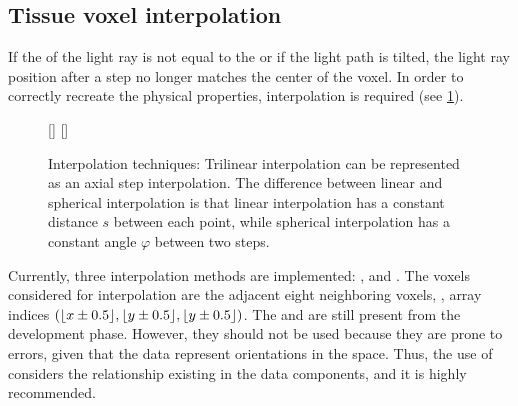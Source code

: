 \subsection{Tissue voxel interpolation}
%
If the \Stepsize{} of the light ray is not equal to the \Voxelsize{} or if the light path is tilted, the light ray position after a step no longer matches the center of the voxel.
In order to correctly recreate the physical properties, interpolation is required (see \cref{fig:vectorfield_disc}).
%
\begin{figure}[!t]
\centering
\setlength{\tikzwidth}{0.475\textwidth}
[\tikzwidth]{
\hfill{}\hfill}\hfill
{}
[\tikzwidth]{
}
\caption{Interpolation techniques: Trilinear interpolation can be represented as an axial step interpolation. The difference between linear and spherical interpolation is that linear interpolation has a constant distance $s$ between each point, while spherical interpolation has a constant angle $\varphi$ between two steps.}
\label{fig:vectorfield_disc}
\end{figure}
%
Currently, three interpolation methods are implemented: ,  and .
The voxels considered for interpolation are the adjacent eight neighboring voxels, \ie{}, array indices $(\lfloor x\pm0.5\rfloor,\lfloor y\pm0.5\rfloor,\lfloor y\pm0.5\rfloor)$.
The  and  are still present from the development phase.
However, they should not be used because they are prone to errors, given that the data represent orientations in the space.
Thus, the use of  considers the relationship existing in the data components, and it is highly recommended.
%
%
%

